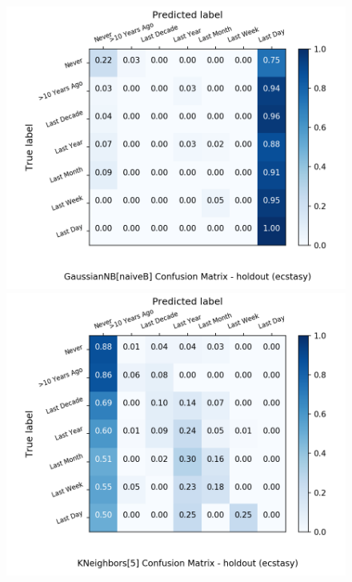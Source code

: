 \begin{figure}[H]
	\begin{minipage}[b]{0.32\textwidth}
		\includegraphics[width=1.1\textwidth]{Plots/drugs/ecstasy_GaussianNB_naiveB_balance_False_holdout.png}
	\end{minipage}
	\begin{minipage}[b]{0.32\textwidth}
		\includegraphics[width=1.1\textwidth]{Plots/drugs/ecstasy_KNeighbors_5_balance_False_holdout.png}
  \end{minipage}
	\begin{minipage}[b]{0.32\textwidth}

\end{minipage}
\end{figure}
